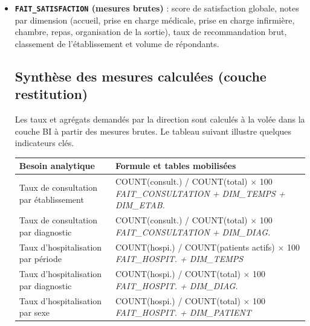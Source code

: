 \documentclass[12pt, a4paper]{report}
\newcommand{\code}[1]{\texttt{#1}}
\begin{document}
\begin{itemize}[label=\textcolor{chuBlue}{\textbullet}]
  \item \textbf{\code{FAIT\_SATISFACTION} (mesures brutes)} :  
  score de satisfaction globale, notes par dimension (accueil, prise en charge médicale, prise en charge infirmière, chambre, repas, organisation de la sortie), taux de recommandation brut, classement de l’établissement et volume de répondants.

\subsection{Synthèse des mesures calculées (couche restitution)}

Les taux et agrégats demandés par la direction sont calculés à la volée dans la couche BI à partir des mesures brutes. Le tableau suivant illustre quelques indicateurs clés.

\begin{table}[htbp]
\centering
\footnotesize
\renewcommand{\arraystretch}{1.5}
\setlength{\tabcolsep}{5pt}
\begin{tabularx}{\linewidth}{@{} >{\raggedright\arraybackslash}p{5.5cm}
                                  >{\raggedright\arraybackslash}X @{}}
\toprule
\rowcolor{chuBlue!15}
\textbf{Besoin analytique} & \textbf{Formule et tables mobilisées} \\
\midrule

Taux de consultation par établissement &
COUNT(consult.) / COUNT(total) $\times$ 100
\newline \textit{FAIT\_CONSULTATION + DIM\_TEMPS + DIM\_ETAB.} \\

\rowcolor{chuGray}
Taux de consultation par diagnostic &
COUNT(consult.) / COUNT(total) $\times$ 100
\newline \textit{FAIT\_CONSULTATION + DIM\_DIAG.} \\

Taux d'hospitalisation par période &
COUNT(hospi.) / COUNT(patients actifs) $\times$ 100
\newline \textit{FAIT\_HOSPIT. + DIM\_TEMPS} \\

\rowcolor{chuGray}
Taux d'hospitalisation par diagnostic &
COUNT(hospi.) / COUNT(total) $\times$ 100
\newline \textit{FAIT\_HOSPIT. + DIM\_DIAG.} \\

Taux d'hospitalisation par sexe &
COUNT(hospi.) / COUNT(total) $\times$ 100
\newline \textit{FAIT\_HOSPIT. + DIM\_PATIENT} \\


\end{tabularx}
\end{table}
\end{itemize}
\end{document}

